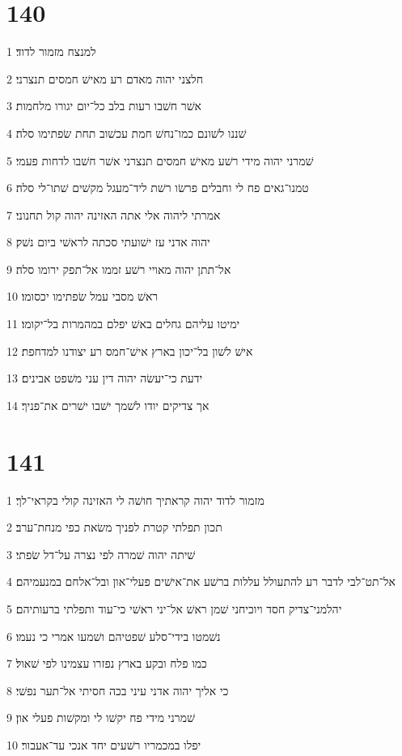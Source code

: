 \chapter{140}

\par 1 למנצח מזמור לדוד׃
\par 2 חלצני יהוה מאדם רע מאישׁ חמסים תנצרני׃
\par 3 אשׁר חשׁבו רעות בלב כל־יום יגורו מלחמות׃
\par 4 שׁננו לשׁונם כמו־נחשׁ חמת עכשׁוב תחת שׂפתימו סלה׃
\par 5 שׁמרני יהוה מידי רשׁע מאישׁ חמסים תנצרני אשׁר חשׁבו לדחות פעמי׃
\par 6 טמנו־גאים פח לי וחבלים פרשׂו רשׁת ליד־מעגל מקשׁים שׁתו־לי סלה׃
\par 7 אמרתי ליהוה אלי אתה האזינה יהוה קול תחנוני׃
\par 8 יהוה אדני עז ישׁועתי סכתה לראשׁי ביום נשׁק׃
\par 9 אל־תתן יהוה מאויי רשׁע זממו אל־תפק ירומו סלה׃
\par 10 ראשׁ מסבי עמל שׂפתימו יכסומו׃
\par 11 ימיטו עליהם גחלים באשׁ יפלם במהמרות בל־יקומו׃
\par 12 אישׁ לשׁון בל־יכון בארץ אישׁ־חמס רע יצודנו למדחפת׃
\par 13 ידעת כי־יעשׂה יהוה דין עני משׁפט אבינים׃
\par 14 אך צדיקים יודו לשׁמך ישׁבו ישׁרים את־פניך׃

\chapter{141}

\par 1 מזמור לדוד יהוה קראתיך חושׁה לי האזינה קולי בקראי־לך׃
\par 2 תכון תפלתי קטרת לפניך משׂאת כפי מנחת־ערב׃
\par 3 שׁיתה יהוה שׁמרה לפי נצרה על־דל שׂפתי׃
\par 4 אל־תט־לבי לדבר רע להתעולל עללות ברשׁע את־אישׁים פעלי־און ובל־אלחם במנעמיהם׃
\par 5 יהלמני־צדיק חסד ויוכיחני שׁמן ראשׁ אל־יני ראשׁי כי־עוד ותפלתי ברעותיהם׃
\par 6 נשׁמטו בידי־סלע שׁפטיהם ושׁמעו אמרי כי נעמו׃
\par 7 כמו פלח ובקע בארץ נפזרו עצמינו לפי שׁאול׃
\par 8 כי אליך יהוה אדני עיני בכה חסיתי אל־תער נפשׁי׃
\par 9 שׁמרני מידי פח יקשׁו לי ומקשׁות פעלי און׃
\par 10 יפלו במכמריו רשׁעים יחד אנכי עד־אעבור׃

